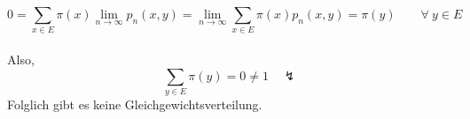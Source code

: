 \begin{itemize}
\begin{equation*}
0 = \sum_{x \in E} \pi (x) \lim_{n \to \infty}p_{n}(x,y) = \lim_{n \to \infty} \sum_{x \in E} \pi(x) p_{n}(x,y) = \pi(y) \qquad \forall \: y \in E
\end{equation*}
\mbox{}
\\
Also,
\begin{equation*}
\sum_{y \in E} \pi (y) = 0 \neq 1 \quad \lightning
\end{equation*}
Folglich gibt es keine Gleichgewichtsverteilung.
\end{itemize}